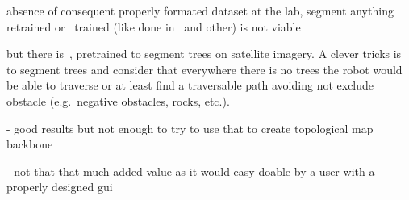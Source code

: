 absence of consequent properly formated dataset at the lab, segment anything retrained or~\cite{ronneberger_u-net_2015} trained (like done in~\cite{zhang_dual-bev_2025}
and other) is not viable

but there is~\cite{bosch_journal_2020}, pretrained to segment trees on satellite imagery.
A clever tricks is to segment trees and consider that everywhere there is no trees the robot would be able to traverse
or at least find a traversable path avoiding not exclude obstacle (e.g.\ negative obstacles, rocks, etc.).



- good results but not enough to try to use that to create topological map backbone

- not that that much added value as it would easy doable by a user with a properly designed gui
